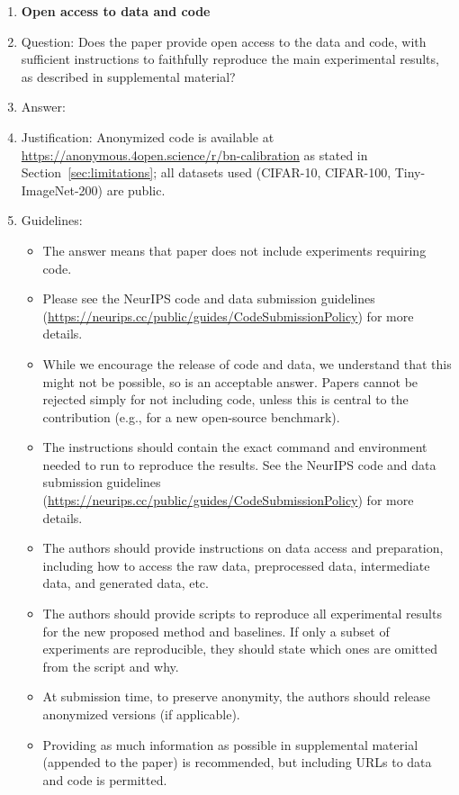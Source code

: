 \documentclass{article}
\begin{document}
\begin{enumerate}
\item {\bf Open access to data and code}
    \item[] Question: Does the paper provide open access to the data and code, with sufficient instructions to faithfully reproduce the main experimental results, as described in supplemental material?
    \item[] Answer: \answerYes{}
    \item[] Justification: Anonymized code is available at \url{https://anonymous.4open.science/r/bn-calibration} as stated in Section~\ref{sec:limitations}; all datasets used (CIFAR-10, CIFAR-100, Tiny-ImageNet-200) are public.
    \item[] Guidelines:
    \begin{itemize}
        \item The answer \answerNA{} means that paper does not include experiments requiring code.
        \item Please see the NeurIPS code and data submission guidelines (\url{https://neurips.cc/public/guides/CodeSubmissionPolicy}) for more details.
        \item While we encourage the release of code and data, we understand that this might not be possible, so \answerNo{} is an acceptable answer. Papers cannot be rejected simply for not including code, unless this is central to the contribution (e.g., for a new open-source benchmark).
        \item The instructions should contain the exact command and environment needed to run to reproduce the results. See the NeurIPS code and data submission guidelines (\url{https://neurips.cc/public/guides/CodeSubmissionPolicy}) for more details.
        \item The authors should provide instructions on data access and preparation, including how to access the raw data, preprocessed data, intermediate data, and generated data, etc.
        \item The authors should provide scripts to reproduce all experimental results for the new proposed method and baselines. If only a subset of experiments are reproducible, they should state which ones are omitted from the script and why.
        \item At submission time, to preserve anonymity, the authors should release anonymized versions (if applicable).
        \item Providing as much information as possible in supplemental material (appended to the paper) is recommended, but including URLs to data and code is permitted.
    \end{itemize}



\end{enumerate}
\end{document}
